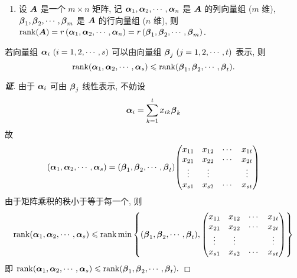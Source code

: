 \begin{enumerate}[label=(\arabic{*})]
    \item 设 $ \vb*{A} $ 是一个 $ m \times n $ 矩阵, 记 $ \vb*{\alpha}_{1}, \vb*{\alpha}_{2}, \cdots, \vb*{\alpha}_{n} $ 是 $ \vb*{A} $ 的列向量组 ($m$ 维), $ \vb*{\beta}_{1}, \vb*{\beta}_{2}, \cdots ,  \vb*{\beta}_{m} $ 是 $ \vb*{A} $ 的行向量组 ($n$ 维), 则 $ \rank(\vb*{A})=r\left(\vb*{\alpha}_{1}, \vb*{\alpha}_{2}, \cdots, \vb*{\alpha}_{n}\right)=r\left(\vb*{\beta}_{1}, \vb*{\beta}_{2}, \cdots, \vb*{\beta}_{m}\right) $.
\end{enumerate}

\begin{theorem}
    若向量组 $\vb*{\alpha}_i~ (i=1,2,\cdots,s)$ 可以由向量组 $\vb*{\beta}_j~ (j=1,2,\cdots,t)$ 表示, 则
    $$\rank(\vb*{\alpha}_1,\vb*{\alpha}_2,\cdots,\vb*{\alpha}_s)\leqslant \rank(\vb*{\beta}_1,\vb*{\beta}_2,\cdots,\vb*{\beta}_t).$$
\end{theorem}
\begin{proof}[{\songti \textbf{证}}]
    由于 $\vb*{\alpha}_i$ 可由 $\vb*{\beta}_j$ 线性表示, 不妨设 $$\vb*{\alpha}_i=\sum_{k=1}^{t}x_{ik}\vb*{\beta}_k$$
    故 $$(\vb*{\alpha}_1,\vb*{\alpha}_2,\cdots,\vb*{\alpha}_s)=(\vb*{\beta}_1,\vb*{\beta}_2,\cdots,\vb*{\beta}_t)\mqty(x_{11}&x_{12}&\cdots&x_{1t}\\x_{21}&x_{22}&\cdots&x_{2t}\\\vdots &\vdots&&\vdots\\x_{s1}&x_{s2}&\cdots&x_{st})$$
    由于矩阵乘积的秩小于等于每一个, 则
    $$\rank(\vb*{\alpha}_1,\vb*{\alpha}_2,\cdots,\vb*{\alpha}_s)\leqslant \rank\min\qty{(\vb*{\beta}_1,\vb*{\beta}_2,\cdots,\vb*{\beta}_t),\mqty(x_{11}&x_{12}&\cdots&x_{1t}\\x_{21}&x_{22}&\cdots&x_{2t}\\\vdots &\vdots&&\vdots\\x_{s1}&x_{s2}&\cdots&x_{st})}$$
    即 $\rank(\vb*{\alpha}_1,\vb*{\alpha}_2,\cdots,\vb*{\alpha}_s)\leqslant \rank(\vb*{\beta}_1,\vb*{\beta}_2,\cdots,\vb*{\beta}_t).$
\end{proof}
